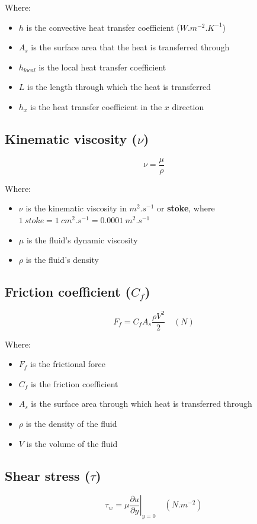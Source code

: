 \documentclass[11pt]{article}
\begin{document}
Where:
\begin{itemize}
\item \(h\) is the convective heat transfer coefficient (\(\unit{W.m^{-2}.K^{-1}}\))
\item \(A_s\) is the surface area that the heat is transferred through
\item \(h_{local}\) is the local heat transfer coefficient
\item \(L\) is the length through which the heat is transferred
\item \(h_x\) is the heat transfer coefficient in the \(x\) direction
\end{itemize}
\subsection{Kinematic viscosity (\(\nu\))}
\label{sec:orgdcb7baa}
\[\nu = \frac{\mu}{\rho}\]

Where:
\begin{itemize}
\item \(\nu\) is the kinematic viscosity in \(\unit{m^2.s^{-1}}\) or \textbf{stoke}, where \(\qty{1}{stoke} = \qty{1}{cm^2.s^{-1}} = \qty{0.0001}{m^2.s^{-1}}\)
\item \(\mu\) is the fluid's dynamic viscosity
\item \(\rho\) is the fluid's density
\end{itemize}
\subsection{Friction coefficient (\(C_f\))}
\label{sec:org545555c}
\[F_f = C_f A_s \frac{\rho V^2}{2} \quad (\unit{N})\]

Where:
\begin{itemize}
\item \(F_f\) is the frictional force
\item \(C_f\) is the friction coefficient
\item \(A_s\) is the surface area through which heat is transferred through
\item \(\rho\) is the density of the fluid
\item \(V\) is the volume of the fluid
\end{itemize}
\subsection{Shear stress (\(\tau\))}
\label{sec:org29a0fb9}
\[\tau_{w} = \mu \left. \frac{\partial u}{\partial y} \right|_{y=0} \quad (\unit{N.m^{-2}})\]
\end{document}
